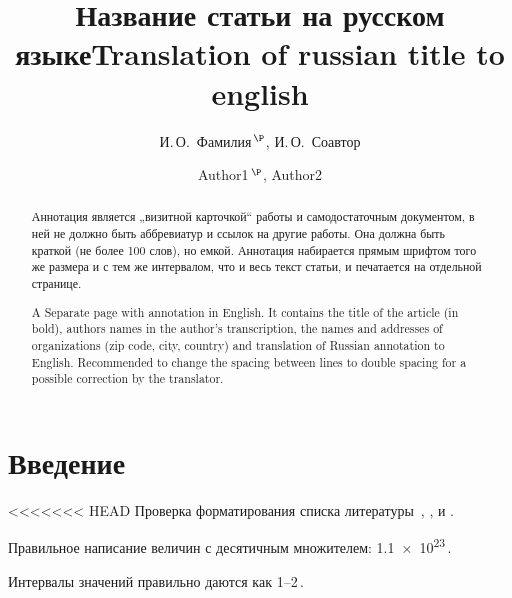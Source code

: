 \documentclass[14pt]{extarticle}
\begin{document}
\title{Название статьи на русском языке}
\author{И.\,О.~Фамилия$^{\,\P}$, И.\,О.~Соавтор}
\address{Физико-технический институт им. А. Ф. Иоффе Российской академии наук, 
\\ 194021, Санкт-Петербург, Россия.}
\maketitle

\begin{abstract}
	Аннотация является „визитной карточкой“ работы и самодостаточным документом,
	в ней не должно быть аббревиатур и ссылок на другие работы. Она должна быть краткой
	(не более 100 слов), но емкой. Аннотация набирается прямым шрифтом того же размера
	и с тем же интервалом, что и весь текст статьи, и печатается на отдельной странице.
\end{abstract}


\begin{otherlanguage}{english}
	\title{Translation of russian title to english}
	\author{Author1$^{\,\P}$, Author2}
	\address{Ioffe Physicotechnical Institute, Russian Academy of Sciences, \\
		194021, St. Petersburg, Russia.}
	\maketitle
	
	\begin{abstract}
		A Separate page with annotation in English. It contains the title of the article (in bold), authors names in the author's transcription, the names and addresses of organizations (zip code, city, country) and translation of Russian annotation to English.  Recommended to change the spacing between lines to double spacing for a possible correction by the translator.
	\end{abstract}
\end{otherlanguage}

\section{Введение}
<<<<<<< HEAD
Проверка форматирования списка литературы~\cite{ref1,ref2,ref3},
\cite{ref4},
\cite{ref5,ref5eng,ref6} и 
\cite{ref7,ref8,ref9}.

Правильное написание величин с десятичным множителем: 
\num{1,1e23}\,. \par
Интервалы значений правильно даются как \numrange{1}{2}\,\ph{\si{\angstrom}}. 
\par
\end{document}
